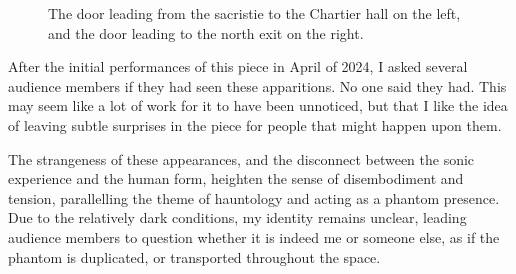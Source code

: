 \documentclass[12pt,twoside,maitrise]{dms_ks}
\theoremstyle{definition}
\begin{document}
\begin{figure}[h]
    \centering
    \caption{The door leading from the sacristie to the Chartier hall on the left, and the door leading to the north exit on the right.}
    \label{fig:sidebyside}
\end{figure}

After the initial performances of this piece in April of 2024, I asked several audience members if they had seen these apparitions. 
No one said they had. 
This may seem like a lot of work for it to have been unnoticed, but that I like the idea of leaving subtle surprises in the piece for people that might happen upon them.

The strangeness of these appearances, and the disconnect between the sonic experience and the human form, heighten the sense of disembodiment and tension, parallelling the theme of hauntology and acting as a phantom presence. 
Due to the relatively dark conditions, my identity remains unclear, leading audience members to question whether it is indeed me or someone else, as if the phantom is duplicated, or transported throughout the space.
\end{document}

